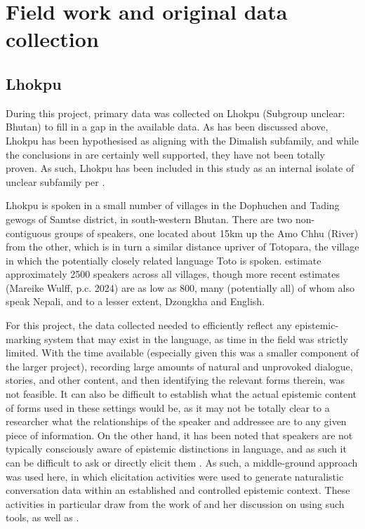 \appendix
\chapter{Field work and original data collection}\label{s:Methods:FieldMethods}
\section{Lhokpu}
During this project, primary data was collected on Lhokpu (Subgroup unclear: Bhutan) to fill in a gap in the available data. As has been discussed above, Lhokpu has been hypothesised as aligning with the Dimalish subfamily, and while the conclusions in  are certainly well supported, they have not been totally proven. As such, Lhokpu has been included in this study as an internal isolate of unclear subfamily per .

Lhokpu is spoken in a small number of villages in the Dophuchen and Tading gewogs of Samtse district, in south-western Bhutan. There are two non-contiguous groups of speakers, one located about 15km up the Amo Chhu (River) from the other, which is in turn a similar distance upriver of Totopara, the village in which the potentially closely related language Toto is spoken.  estimate approximately 2500 speakers across all villages, though more recent estimates (Mareike Wulff, p.c. 2024) are as low as 800, many (potentially all) of whom also speak Nepali, and to a lesser extent, Dzongkha and English.

For this project, the data collected needed to efficiently reflect any epistemic-marking system that may exist in the language, as time in the field was strictly limited. With the time available (especially given this was a smaller component of the larger project), recording large amounts of natural and unprovoked dialogue, stories, and other content, and then identifying the relevant forms therein, was not feasible. It can also be difficult to establish what the actual epistemic content of forms used in these settings would be, as it may not be totally clear to a researcher what the relationships of the speaker and addressee are to any given piece of information. On the other hand, it has been noted that speakers are not typically consciously aware of epistemic distinctions in language, and as such it can be difficult to ask or directly elicit them \cites{Gawne2013}{Grzech2020}. As such, a middle-ground approach was used here, in which elicitation activities were used to generate naturalistic conversation data within an established and controlled epistemic context. These activities in particular draw from the work of  and her discussion on using such tools, as well as .

